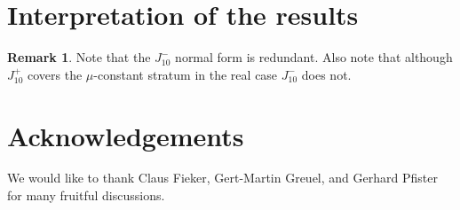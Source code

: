\documentclass[noend]{amsproc}
\theoremstyle{definition}
\newtheorem{remark}[theorem]{Remark}
\begin{document}
\section{Interpretation of the results}

\begin{remark}
Note that the $J_{10}^-$ normal form is redundant. Also note that although
$J_{10}^+$ covers the $\mu$-constant stratum in the real case $J_{10}^-$ does
not.
\end{remark}


\section{Acknowledgements}

We would like to thank Claus Fieker, Gert-Martin Greuel, and Gerhard Pfister
for many fruitful discussions.


\clearpage
\end{document}
